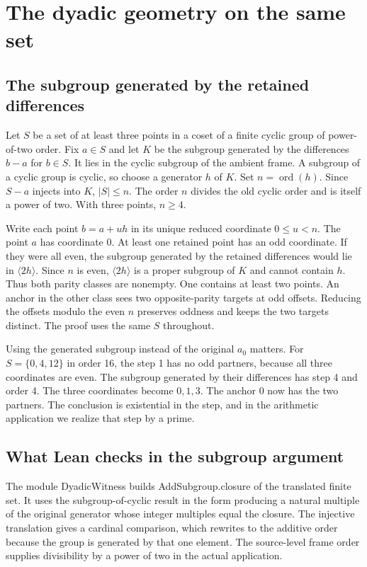 \documentclass[12pt,letterpaper]{article}
\DeclareRobustCommand{\id}[1]{\mbox{\small\ttfamily #1}}
\begin{document}
\section{The dyadic geometry on the same set}
\label{sec:geometry}

\subsection{The subgroup generated by the retained differences}

Let \(S\) be a set of at least three points in a coset of a finite cyclic group of power-of-two order. Fix \(a\in S\) and let \(K\) be the subgroup generated by the differences \(b-a\) for \(b\in S\). It lies in the cyclic subgroup of the ambient frame. A subgroup of a cyclic group is cyclic, so choose a generator \(h\) of \(K\). Set \(n=\operatorname{ord}(h)\). Since \(S-a\) injects into \(K\), \(|S|\le n\). The order \(n\) divides the old cyclic order and is itself a power of two. With three points, \(n\ge4\).

Write each point \(b=a+u h\) in its unique reduced coordinate \(0\le u<n\). The point \(a\) has coordinate 0. At least one retained point has an odd coordinate. If they were all even, the subgroup generated by the retained differences would lie in \(\langle 2h\rangle\). Since \(n\) is even, \(\langle 2h\rangle\) is a proper subgroup of \(K\) and cannot contain \(h\). Thus both parity classes are nonempty. One contains at least two points. An anchor in the other class sees two opposite-parity targets at odd offsets. Reducing the offsets modulo the even \(n\) preserves oddness and keeps the two targets distinct. The proof uses the same \(S\) throughout.

Using the generated subgroup instead of the original \(a_0\) matters. For \(S=\{0,4,12\}\) in order 16, the step 1 has no odd partners, because all three coordinates are even. The subgroup generated by their differences has step 4 and order 4. The three coordinates become \(0,1,3\). The anchor 0 now has the two partners. The conclusion is existential in the step, and in the arithmetic application we realize that step by a prime.

\subsection{What Lean checks in the subgroup argument}

The module \id{DyadicWitness} builds \id{AddSubgroup.closure} of the translated finite set. It uses the subgroup-of-cyclic result in the form producing a natural multiple of the original generator whose integer multiples equal the closure. The injective translation gives a cardinal comparison, which rewrites to the additive order because the group is generated by that one element. The source-level frame order supplies divisibility by a power of two in the actual application.
\end{document}
